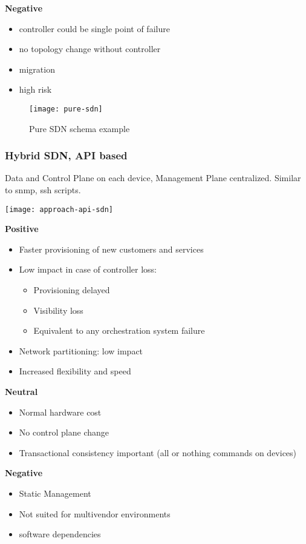 \noindent
\textbf{Negative}
\begin{itemize}
	\item controller could be single point of failure 
	\item no topology change without controller 
	\item migration
	\item high risk
\end{itemize} 

\begin{figure}
	\centering
	\caption{Pure SDN schema example}
	\texttt{[image: pure-sdn]}
\end{figure}

\subsubsection{Hybrid SDN, API based}
Data and Control Plane on each device, Management Plane centralized. Similar to snmp, ssh scripts. 

\texttt{[image: approach-api-sdn]}

\noindent
\textbf{Positive}
\begin{itemize}
	\item Faster provisioning of new customers and services 
    \item Low impact in case of controller loss: 
	\begin{itemize}
        \item Provisioning delayed
        \item Visibility loss 
		\item Equivalent to any orchestration system failure 
	\end{itemize}
	\item Network partitioning: low impact 
	\item Increased flexibility and speed 
\end{itemize}

\noindent
\textbf{Neutral}
\begin{itemize}
\item Normal hardware cost 
\item No control plane change 
\item Transactional consistency important (all or nothing commands on devices)  
\end{itemize}

\noindent
\textbf{Negative}
\begin{itemize}
	\item Static Management
    \item Not suited for multivendor environments 
	\item software dependencies  
\end{itemize}

